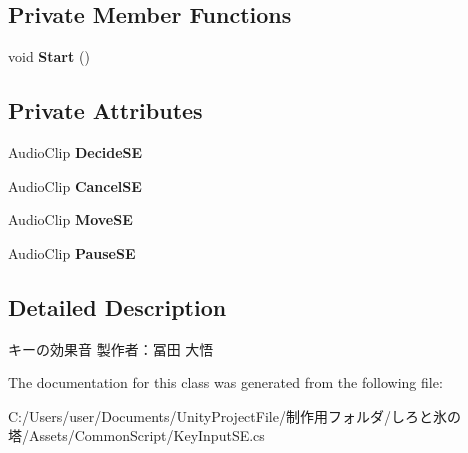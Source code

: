\subsection*{Private Member Functions}
\begin{DoxyCompactItemize}
\item 
\mbox{\label{class_key_input_s_e_ad825b230372e9840e21e8259bb3d17e9}} 
void {\bfseries Start} ()
\end{DoxyCompactItemize}
\subsection*{Private Attributes}
\begin{DoxyCompactItemize}
\item 
\mbox{\label{class_key_input_s_e_a910c3c32df8fffa965ef6cbc53b79242}} 
Audio\+Clip {\bfseries Decide\+SE}
\item 
\mbox{\label{class_key_input_s_e_a88f05337649b1e13e465691f96b92b0f}} 
Audio\+Clip {\bfseries Cancel\+SE}
\item 
\mbox{\label{class_key_input_s_e_a345f83309b71aec9e933d72690853171}} 
Audio\+Clip {\bfseries Move\+SE}
\item 
\mbox{\label{class_key_input_s_e_a3939f1aacf98a4d758b26c2975f2a3f0}} 
Audio\+Clip {\bfseries Pause\+SE}
\end{DoxyCompactItemize}


\subsection{Detailed Description}
キーの効果音 製作者：冨田 大悟 



The documentation for this class was generated from the following file\+:\begin{DoxyCompactItemize}
\item 
C\+:/\+Users/user/\+Documents/\+Unity\+Project\+File/制作用フォルダ/しろと氷の塔/\+Assets/\+Common\+Script/Key\+Input\+S\+E.\+cs\end{DoxyCompactItemize}

